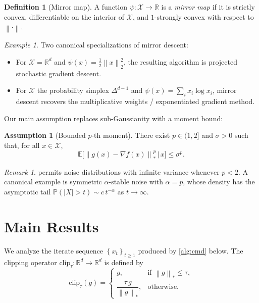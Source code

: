 \documentclass[11pt,a4paper]{article}
\theoremstyle{plain}
\theoremstyle{definition}
\newtheorem{definition}[theorem]{Definition}
\newtheorem{assumption}[theorem]{Assumption}
\theoremstyle{remark}
\newtheorem{remark}[theorem]{Remark}
\newtheorem{example}[theorem]{Example}
\newcommand{\R}{\mathbb{R}}
\newcommand{\E}{\mathbb{E}}
\newcommand{\PP}{\mathbb{P}}
\newcommand{\norm}[1]{\left\lVert#1\right\rVert}
\newcommand{\abs}[1]{\left\lvert#1\right\rvert}
\newcommand{\set}[1]{\left\{#1\right\}}
\begin{document}
\begin{definition}[Mirror map]
\label{def:mirror}
A function $\psi \colon \mathcal{X} \to \R$ is a \emph{mirror map} if it is
strictly convex, differentiable on the interior of $\mathcal{X}$, and
$1$-strongly convex with respect to $\norm{\cdot}$.
\end{definition}

\begin{example}
\label{ex:specializations}
Two canonical specializations of mirror descent:
\begin{itemize}[leftmargin=*]
    \item For $\mathcal{X} = \R^d$ and $\psi(x) = \tfrac{1}{2}\norm{x}_2^2$,
          the resulting algorithm is projected stochastic gradient descent.
    \item For $\mathcal{X}$ the probability simplex $\Delta^{d-1}$ and
          $\psi(x) = \sum_i x_i \log x_i$, mirror descent recovers the
          multiplicative weights / exponentiated gradient method.
\end{itemize}
\end{example}

Our main assumption replaces sub-Gaussianity with a moment bound:

\begin{assumption}[Bounded $p$-th moment]
\label{ass:moment}
There exist $p \in (1, 2]$ and $\sigma > 0$ such that, for all
$x \in \mathcal{X}$,
\begin{equation*}
    \E\bigl[ \norm{g(x) - \nabla f(x)}_*^p \,\big|\, x \bigr] \leq \sigma^p.
\end{equation*}
\end{assumption}

\begin{remark}
 permits noise distributions with infinite variance whenever
$p < 2$. A canonical example is symmetric $\alpha$-stable noise with
$\alpha = p$, whose density has the asymptotic tail
$\PP(\abs{X} > t) \sim c \, t^{-\alpha}$ as $t \to \infty$.
\end{remark}

\section{Main Results}
\label{sec:main}

We analyze the iterate sequence $\set{x_t}_{t \geq 1}$ produced by
\cref{alg:cmd} below. The clipping operator $\mathrm{clip}_\tau \colon \R^d
\to \R^d$ is defined by
\begin{equation}
\label{eq:clip}
    \mathrm{clip}_\tau(g) =
    \begin{cases}
        g, & \text{if } \norm{g}_* \leq \tau, \\[2pt]
        \dfrac{\tau \, g}{\norm{g}_*}, & \text{otherwise.}
    \end{cases}
\end{equation}
\end{document}
